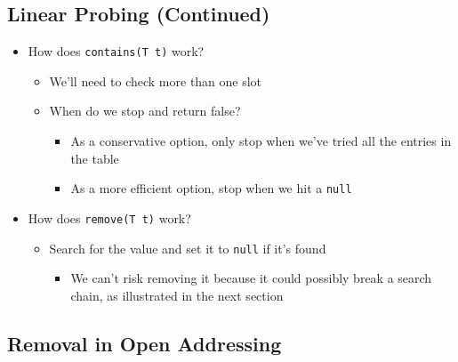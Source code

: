 \documentclass[
  10pt,
  english,
  letterpaper,
,tablecaptionabove
]{scrartcl}
\newcommand{\passthrough}[1]{#1}
\providecommand{\tightlist}{%
  \setlength{\itemsep}{0pt}\setlength{\parskip}{0pt}}
\begin{document}
\hypertarget{linear-probing-continued}{%
\subsection{Linear Probing (Continued)}\label{linear-probing-continued}}

\begin{itemize}
\tightlist
\item
  How does \passthrough{\lstinline!contains(T t)!} work?

  \begin{itemize}
  \tightlist
  \item
    We'll need to check more than one slot
  \item
    When do we stop and return false?

    \begin{itemize}
    \tightlist
    \item
      As a conservative option, only stop when we've tried all the
      entries in the table
    \item
      As a more efficient option, stop when we hit a
      \passthrough{\lstinline!null!}
    \end{itemize}
  \end{itemize}
\item
  How does \passthrough{\lstinline!remove(T t)!} work?

  \begin{itemize}
  \tightlist
  \item
    Search for the value and set it to \passthrough{\lstinline!null!} if
    it's found

    \begin{itemize}
    \tightlist
    \item
      We can't risk removing it because it could possibly break a search
      chain, as illustrated in the next section
    \end{itemize}
  \end{itemize}
\end{itemize}

\hypertarget{removal-in-open-addressing}{%
\subsection{Removal in Open
Addressing}\label{removal-in-open-addressing}}
\end{document}
